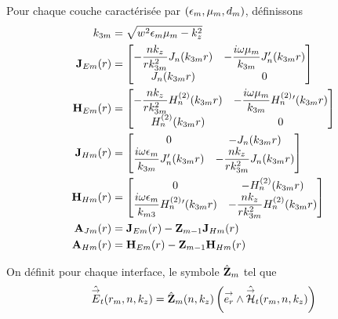         \begin{defn}
            Pour chaque couche caractérisée par \((\epsilon_m,\mu_m,d_m)\), définissons
            \begin{subequations}
                \begin{align}
                    k_{3m} &= \sqrt{w^2\epsilon_m\mu_m - k_z^2}
                    \\
                    \mathbf{J}_{Em}(r) &= 
                        \begin{bmatrix}
                            -\dfrac{nk_z}{rk_{3m}^2}J_n(k_{3m}r) & -\dfrac{i\omega\mu_m}{k_{3m}}J_n'(k_{3m}r)
                            \\
                            J_n(k_{3m}r) & 0
                        \end{bmatrix}
                    \\
                    \mathbf{H}_{Em}(r) &= 
                        \begin{bmatrix}
                            -\dfrac{nk_z}{rk_{3m}^2}H_n^{(2)}(k_{3m}r) & -\dfrac{i\omega\mu_m}{k_{3m}}H_n^{(2)}{}'(k_{3m}r)
                            \\
                            H_n^{(2)}(k_{3m}r) & 0
                        \end{bmatrix}
                    \\
                    \mathbf{J}_{Hm}(r) &= 
                        \begin{bmatrix}
                            0 & -J_n(k_{3m}r)
                            \\
                            \dfrac{i\omega\epsilon_m}{k_{3m}}J_n'(k_{3m}r) & -\dfrac{nk_z}{rk_{3m}^2}J_n(k_{3m}r)
                        \end{bmatrix}
                    \\
                    \mathbf{H}_{Hm}(r) &= 
                        \begin{bmatrix}
                            0 & -H_n^{(2)}(k_{3m}r)
                            \\
                            \dfrac{i\omega\epsilon_m}{k_{m3}}H_n^{(2)}{}'(k_{3m}r) & -\dfrac{nk_z}{rk_{3m}^2}H_n^{(2)}(k_{3m}r)
                        \end{bmatrix}
                    \\
                    \mathbf{A}_{Jm}(r) &= \mathbf{J}_{Em}(r) -  \mathbf{Z}_{m-1} \mathbf{J}_{Hm}(r)
                    \\
                    \mathbf{A}_{Hm}(r) &= \mathbf{H}_{Em}(r) -  \mathbf{Z}_{m-1} \mathbf{H}_{Hm}(r)
                \end{align}
            \end{subequations}

            On définit pour chaque interface, le symbole \(\hat {\mathbf{Z}}_m\) tel que 
            \begin{equation}
                \hat {{\overset{\rightarrow}{E}}}_t(r_m,n,k_z) = \hat {\mathbf{Z}}_m(n,k_z) \left({\overset{\rightarrow}{e_r}} \wedge \hat {{\overset{\rightarrow}{\mathcal{H}}}}_t(r_m,n,k_z)\right)
            \end{equation}
        \end{defn}

